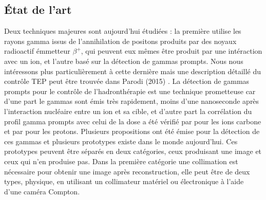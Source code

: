 \documentclass[11pt,a4paper,oldfontcommands]{memoir}
\begin{document}
\subsection{\'Etat de l'art}

Deux techniques majeures sont aujourd'hui étudiées : la première utilise les rayons gamma issus de l'annihilation de positons produits par des noyaux radioactif émmetteur $\beta^+$, qui peuvent eux mêmes être produit par une intéraction avec un ion, et l'autre basé sur la détection de gammas prompts. Nous nous intéressons plus particulièrement à cette dernière mais une description détaillé du contrôle TEP peut être trouvée dans Parodi (2015) \cite{Parodi20157153}. La détection de gammas prompts pour le contrôle de l'hadronthérapie est une technique prometteuse car d'une part le gammas sont émis très rapidement, moins d'une nanoseconde après l’interaction nucléaire entre un ion et sa cible, et d'autre part la corrélation du profil gamma prompts avec celui de la dose a été vérifié par \cite{PGMonitoringC12}pour les ions carbone et par \cite{Min2006} pour les protons. Plusieurs propositions ont été émise pour la détection de ces gammas et plusieurs prototypes existe dans le monde aujourd'hui. Ces prototypes peuvent être séparés en deux catégories, ceux produisant une image et ceux qui n'en produise pas. Dans la première catégorie une collimation est nécessaire pour obtenir une image après reconstruction, elle peut être de deux types, physique, en utilisant un collimateur matériel ou électronique à l'aide d'une caméra Compton. 
\end{document}
